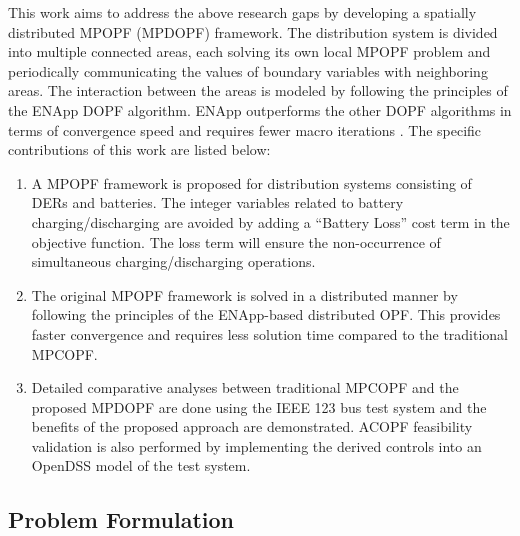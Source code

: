 This work aims to address the above research gaps by developing a spatially distributed MPOPF (MPDOPF) framework. The distribution system is divided into multiple connected areas, each solving its own local MPOPF problem and periodically communicating the values of boundary variables with neighboring areas. The interaction between the areas is modeled by following the principles of the ENApp DOPF algorithm. ENApp outperforms the other DOPF algorithms in terms of convergence speed and requires fewer macro iterations \cite{Sadnan}. The specific contributions of this work are listed below:
\begin{enumerate}
    \item A MPOPF framework is proposed for distribution systems consisting of DERs and batteries. The integer variables related to battery charging/discharging are avoided by adding a ``Battery Loss'' cost term in the objective function. The loss term will ensure the non-occurrence of simultaneous charging/discharging operations.
    \item The original MPOPF framework is solved in a distributed manner by following the principles of the ENApp-based distributed OPF. This provides faster convergence and requires less solution time compared to the traditional MPCOPF.
    \item Detailed comparative analyses between traditional MPCOPF and the proposed MPDOPF are done using the IEEE 123 bus test system and the benefits of the proposed approach are demonstrated. ACOPF feasibility validation is also performed by implementing the derived controls into an OpenDSS model of the test system.
\end{enumerate}

\subsection{Problem Formulation}

